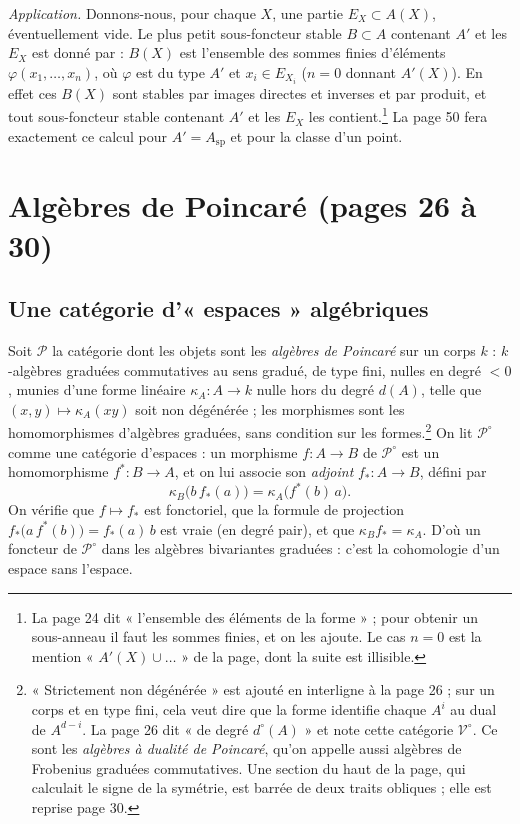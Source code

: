 \documentclass[11pt,a4paper]{article}
\begin{document}
\emph{Application.} Donnons-nous, pour chaque $X$, une partie
$E_{X} \subset A(X)$, éventuellement vide. Le plus petit sous-foncteur stable
$B \subset A$ contenant $A'$ et les $E_{X}$ est donné par : $B(X)$ est
l'ensemble des sommes finies d'éléments
$\varphi(x_{1}, \ldots, x_{n})$, où $\varphi$ est du type $A'$ et
$x_{i} \in E_{X_{i}}$ ($n = 0$ donnant $A'(X)$). En effet ces $B(X)$ sont
stables par images directes et inverses et par produit, et tout sous-foncteur
stable contenant $A'$ et les $E_{X}$ les contient.\footnote{La page 24 dit
« l'ensemble des éléments de la forme » ; pour obtenir un sous-anneau il faut
les sommes finies, et on les ajoute. Le cas $n = 0$ est la mention
« $A'(X) \cup \ldots$ » de la page, dont la suite est illisible.} La page 50
fera exactement ce calcul pour $A' = A_{\mathrm{sp}}$ et pour la classe d'un
point.

\section*{Algèbres de Poincaré (pages 26 à 30)}

\subsection*{Une catégorie d'« espaces » algébriques}

Soit $\mathcal{P}$ la catégorie dont les objets sont les \emph{algèbres de
Poincaré} sur un corps $k$ : $k$-algèbres graduées commutatives au sens gradué,
de type fini, nulles en degré $< 0$, munies d'une forme linéaire
$\kappa_{A} \colon A \to k$ nulle hors du degré $d(A)$, telle que
$(x, y) \mapsto \kappa_{A}(xy)$ soit non dégénérée ; les morphismes sont les
homomorphismes d'algèbres graduées, sans condition sur les
formes.\footnote{« Strictement non dégénérée » est ajouté en interligne à la
page 26 ; sur un corps et en type fini, cela veut dire que la forme identifie
chaque $A^{i}$ au dual de $A^{d-i}$. La page 26 dit « de degré $d^{\circ}(A)$ »
et note cette catégorie $\mathcal{V}^{\circ}$. Ce sont les \emph{algèbres à
dualité de Poincaré}, qu'on appelle aussi algèbres de Frobenius graduées
commutatives. Une section du haut de la page, qui calculait le signe de la
symétrie, est barrée de deux traits obliques ; elle est reprise page 30.} On
lit $\mathcal{P}^{\circ}$ comme une catégorie d'espaces : un morphisme
$f \colon A \to B$ de $\mathcal{P}^{\circ}$ est un homomorphisme
$f^{*} \colon B \to A$, et on lui associe son \emph{adjoint}
$f_{*} \colon A \to B$, défini par
\[ \kappa_{B}\bigl(b\, f_{*}(a)\bigr) = \kappa_{A}\bigl(f^{*}(b)\, a\bigr) . \]
On vérifie que $f \mapsto f_{*}$ est fonctoriel, que la formule de projection
$f_{*}\bigl(a\, f^{*}(b)\bigr) = f_{*}(a)\, b$ est vraie (en degré pair), et
que $\kappa_{B} f_{*} = \kappa_{A}$. D'où un foncteur de
$\mathcal{P}^{\circ}$ dans les algèbres bivariantes graduées : c'est la
cohomologie d'un espace sans l'espace.
\end{document}
